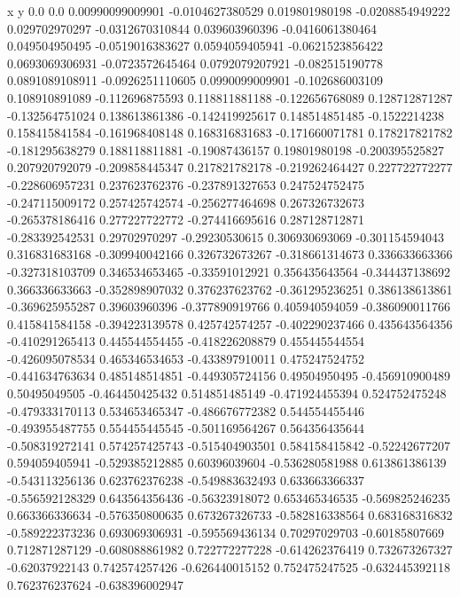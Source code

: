               x                y
            0.0              0.0
0.00990099009901  -0.0104627380529
 0.019801980198  -0.0208854949222
 0.029702970297  -0.0312670310844
 0.039603960396  -0.0416061380464
 0.049504950495  -0.0519016383627
0.0594059405941  -0.0621523856422
0.0693069306931  -0.0723572645464
0.0792079207921  -0.082515190778
0.0891089108911  -0.0926251110605
0.0990099009901  -0.102686003109
 0.108910891089  -0.112696875593
 0.118811881188  -0.122656768089
 0.128712871287  -0.132564751024
 0.138613861386  -0.142419925617
 0.148514851485    -0.1522214238
 0.158415841584  -0.161968408148
 0.168316831683  -0.171660071781
 0.178217821782  -0.181295638279
 0.188118811881   -0.19087436157
  0.19801980198  -0.200395525827
 0.207920792079  -0.209858445347
 0.217821782178  -0.219262464427
 0.227722772277  -0.228606957231
 0.237623762376  -0.237891327653
 0.247524752475  -0.247115009172
 0.257425742574  -0.256277464698
 0.267326732673  -0.265378186416
 0.277227722772  -0.274416695616
 0.287128712871  -0.283392542531
  0.29702970297   -0.29230530615
 0.306930693069  -0.301154594043
 0.316831683168  -0.309940042166
 0.326732673267  -0.318661314673
 0.336633663366  -0.327318103709
 0.346534653465   -0.33591012921
 0.356435643564  -0.344437138692
 0.366336633663  -0.352898907032
 0.376237623762  -0.361295236251
 0.386138613861  -0.369625955287
  0.39603960396  -0.377890919766
 0.405940594059  -0.386090011766
 0.415841584158  -0.394223139578
 0.425742574257  -0.402290237466
 0.435643564356  -0.410291265413
 0.445544554455  -0.418226208879
 0.455445544554  -0.426095078534
 0.465346534653  -0.433897910011
 0.475247524752  -0.441634763634
 0.485148514851  -0.449305724156
  0.49504950495  -0.456910900489
  0.50495049505  -0.464450425432
 0.514851485149  -0.471924455394
 0.524752475248  -0.479333170113
 0.534653465347  -0.486676772382
 0.544554455446  -0.493955487755
 0.554455445545  -0.501169564267
 0.564356435644  -0.508319272141
 0.574257425743  -0.515404903501
 0.584158415842   -0.52242677207
 0.594059405941  -0.529385212885
  0.60396039604  -0.536280581988
 0.613861386139  -0.543113256136
 0.623762376238  -0.549883632493
 0.633663366337  -0.556592128329
 0.643564356436   -0.56323918072
 0.653465346535  -0.569825246235
 0.663366336634  -0.576350800635
 0.673267326733  -0.582816338564
 0.683168316832  -0.589222373236
 0.693069306931  -0.595569436134
  0.70297029703   -0.60185807669
 0.712871287129  -0.608088861982
 0.722772277228  -0.614262376419
 0.732673267327   -0.62037922143
 0.742574257426  -0.626440015152
 0.752475247525  -0.632445392118
 0.762376237624  -0.638396002947
